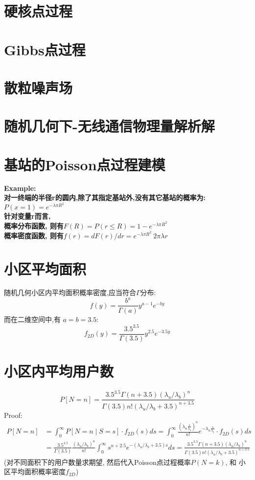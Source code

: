         \section{硬核点过程}
        
        \section{Gibbs点过程}
        
        \section{散粒噪声场}
    


\section{随机几何下-无线通信物理量解析解}
    \section{基站的Poisson点过程建模}
        \bf{Example:}\\
            对一终端的半径r的圆内,除了其指定基站外,没有其它基站的概率为: $P(x = 1) = e^{-\lambda \pi R^2}$\\
            针对变量r而言,\\
            概率分布函数, 则有\quad $F(R) = P(r \le R) = 1 - e^{-\lambda \pi R^2}$\\
            概率密度函数, 则有\quad $f(r) = dF(r) / dr = e^{-\lambda \pi R^2}\ 2 \pi \lambda r$
    \section{小区平均面积}
        随机几何小区内平均面积概率密度,应当符合$\Gamma$分布:
            $$f(y)=\frac{b^{a}}{\Gamma(a)} y^{a-1} e^{-by}$$
        而在二维空间中,有 $a = b = 3.5$:
            $$f_{2 D}(y)=\frac{3.5^{3.5}}{\Gamma(3.5)} y^{2.5} e^{-3.5 y}$$
    \section{小区内平均用户数}
        $$P[N=n]=\frac{3.5^{3.5} \Gamma(n+3.5)\left(\lambda_{u} / \lambda_{b}\right)^{n}}{\Gamma(3.5) n !\left(\lambda_{u} / \lambda_{b}+3.5\right)^{n+3.5}}$$
        Proof:
        \begin{align*}
        P[N=n]  
            &=\int_{0}^{\infty} P[N=n \mid S=s] \cdot f_{2D}(s) d s =\int_{0}^{\infty} \frac{\left(\lambda_{u} \frac{s}{\lambda_{b}}\right)^{n}}{n !} e^{-\lambda_{u} \frac{s}{\lambda_{b}}} \cdot f_{2D}(s) d s \\
            &=\frac{3.5^{3.5}}{\Gamma(3.5)} \frac{\left(\lambda_{u} / \lambda_{b}\right)^{n}}{n !} \int_{0}^{\infty} s^{n+2.5} e^{-\left(\lambda_{u} / \lambda_{b}+3.5\right) s} d s =\frac{3.5^{3.5} \Gamma(n+3.5)\left(\lambda_{u} / \lambda_{b}\right)^{n}}{\Gamma(3.5) n !\left(\lambda_{u} / \lambda_{b}+3.5\right)^{n+3.5}}
        \end{align*}
        (对不同面积下的用户数量求期望, 然后代入Poisson点过程概率$P(N=k)$, 和 小区平均面积概率密度$f_{2D}$)

